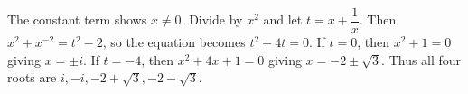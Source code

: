 The constant term shows $x\ne0$. Divide by $x^2$ and let $t=x+\dfrac{1}{x}$. Then $x^2+x^{-2}=t^2-2$, so the equation becomes $t^2+4t=0$. If $t=0$, then $x^2+1=0$ giving $x=\pm i$. If $t=-4$, then $x^2+4x+1=0$ giving $x=-2\pm\sqrt3$. Thus all four roots are $\boxed{i,-i,-2+\sqrt3,-2-\sqrt3}$.
